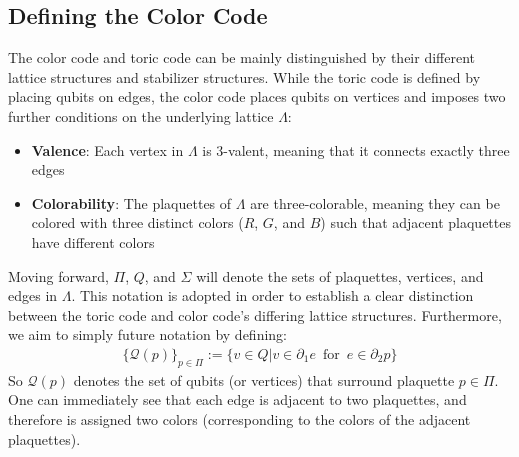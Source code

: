 \documentclass[12pt]{article}
\theoremstyle{definition}
\begin{document}
\subsection{Defining the Color Code}
The color code and toric code can be mainly distinguished by their different lattice structures and stabilizer structures. While the toric code is defined by placing qubits on edges, the color code places qubits on vertices and imposes two further conditions on the underlying lattice $\Lambda$:
\begin{itemize}
    \item \textbf{Valence}: Each vertex in $\Lambda$ is $3$-valent, meaning that it connects exactly three edges
    \item \textbf{Colorability}: The plaquettes of $\Lambda$ are three-colorable, meaning they can be colored with three distinct colors ($R$, $G$, and $B$) such that adjacent plaquettes have different colors
\end{itemize}
Moving forward, $\Pi$, $Q$, and $\Sigma$ will denote the sets of plaquettes, vertices, and edges in $\Lambda$. This notation is adopted in order to establish a clear distinction between the toric code and color code's differing lattice structures. Furthermore, we aim to simply future notation by defining:
    \begin{align}
        \{\mathcal{Q}(p)\}_{p\in\Pi} := \{v\in Q|v\in\partial_1e\enspace\text{for}\enspace e\in\partial_2p\}
    \end{align}
So $\mathcal{Q}(p)$ denotes the set of qubits (or vertices) that surround plaquette $p\in\Pi$. One can immediately see that each edge is adjacent to two plaquettes, and therefore is assigned two colors (corresponding to the colors of the adjacent plaquettes).\newline
\end{document}

